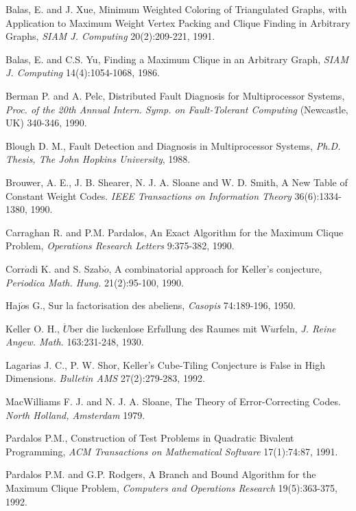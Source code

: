 \setlength{\baselineskip}{.66\baselineskip}
\begin{thebibliography}{100}

Balas, E. and J. Xue, Minimum Weighted Coloring of Triangulated Graphs, with
Application to Maximum Weight Vertex Packing and Clique Finding in Arbitrary
Graphs, {\it SIAM J. Computing} 20(2):209-221, 1991.

Balas, E. and C.S. Yu, Finding a Maximum Clique in an Arbitrary Graph,
{\it SIAM J. Computing} 14(4):1054-1068, 1986.

Berman P. and A. Pelc, Distributed Fault Diagnosis for Multiprocessor Systems,
{\it Proc. of the 20th Annual Intern. Symp. on Fault-Tolerant Computing}
 (Newcastle, UK) 340-346, 1990.

 Blough D. M., Fault Detection and Diagnosis in
Multiprocessor Systems, {\em Ph.D. Thesis, The John Hopkins
University}, 1988.

Brouwer, A. E., J. B. Shearer, N. J. A. Sloane and W. D. Smith,
A New Table of Constant Weight Codes. {\it IEEE Transactions on Information
Theory} 36(6):1334-1380, 1990.

Carraghan R. and P.M. Pardalos, An Exact Algorithm for the Maximum Clique
Problem, {\it Operations Research Letters} 9:375-382, 1990.

Corr$\acute{a}$di K. and S. Szab$\acute{o}$, A combinatorial approach for
Keller's conjecture, {\it Periodica Math. Hung.} 21(2):95-100, 1990.

Haj$\acute{o}$s G., Sur la factorisation des abeliens, {\it Casopis}
74:189-196, 1950.

Keller O. H., $\ddot{U}$ber die l$\ddot{u}$ckenlose Erf$\ddot{u}$llung des
Raumes mit W$\ddot{u}$rfeln, {\it J. Reine Angew. Math.} 163:231-248, 1930.

Lagarias J. C., P. W. Shor, Keller's Cube-Tiling Conjecture is False in High
Dimensions. {\it Bulletin AMS} 27(2):279-283, 1992.

MacWilliams F. J. and N. J. A. Sloane, The Theory of Error-Correcting Codes.
{\it North Holland, Amsterdam} 1979.

Pardalos P.M., Construction of Test Problems in Quadratic Bivalent Programming,
{\it ACM Transactions on Mathematical Software} 17(1):74:87, 1991.

Pardalos P.M. and G.P. Rodgers, A Branch and Bound Algorithm for the Maximum
Clique Problem, {\it Computers and Operations Research} 19(5):363-375, 1992.


\end{thebibliography}
